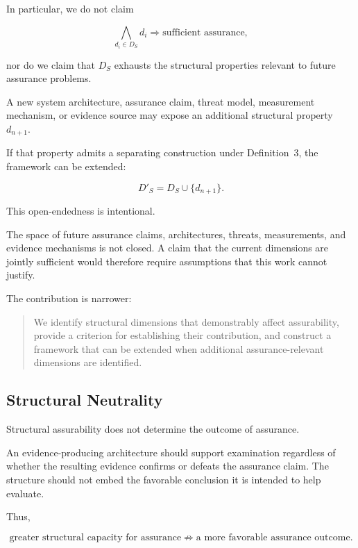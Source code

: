 In particular, we do not claim

\begin{equation}
  \bigwedge_{d_i \in D_S} d_i
  \Longrightarrow
  \text{sufficient assurance},
  \label{eq:no-sufficiency}
\end{equation}

nor do we claim that \(D_S\) exhausts the structural properties
relevant to future assurance problems.

A new system architecture, assurance claim, threat model,
measurement mechanism, or evidence source may expose an
additional structural property \(d_{n+1}\).

If that property admits a separating construction under
Definition~3, the framework can be extended:

\begin{equation}
  D'_S = D_S \cup \{d_{n+1}\}.
\end{equation}

This open-endedness is intentional.

The space of future assurance claims, architectures, threats,
measurements, and evidence mechanisms is not closed.
A claim that the current dimensions are jointly sufficient
would therefore require assumptions that this work cannot justify.

The contribution is narrower:

\begin{quote}
  We identify structural dimensions that demonstrably affect
  assurability, provide a criterion for establishing their
  contribution, and construct a framework that can be extended
  when additional assurance-relevant dimensions are identified.
\end{quote}

\subsection{Structural Neutrality}
\label{aa.subsec.structural-neutrality}

Structural assurability does not determine the outcome of assurance.

An evidence-producing architecture should support examination
regardless of whether the resulting evidence confirms or defeats
the assurance claim.
The structure should not embed the favorable conclusion
it is intended to help evaluate.

Thus,

\begin{equation}
  \text{greater structural capacity for assurance}
  \not\Rightarrow
  \text{a more favorable assurance outcome}.
\end{equation}

